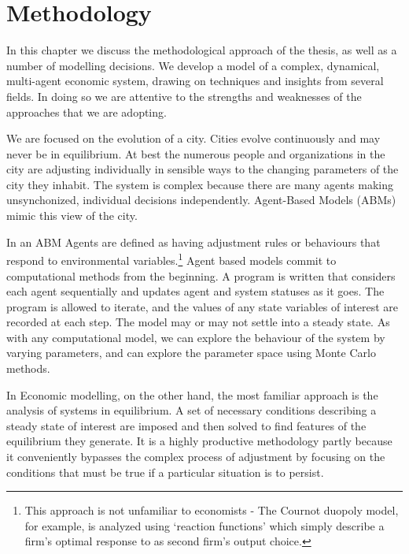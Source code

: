 \chapter{Methodology} \label{chapter-methodology}

In this chapter we discuss the methodological approach of the thesis, as well as a number of modelling decisions. We develop a model of a complex, dynamical, multi-agent economic system, drawing on techniques and insights from several fields. In doing so we are attentive to the strengths and weaknesses of the approaches that we are adopting. 

We are focused on the evolution of a city. Cities evolve continuously and may never be in  equilibrium. At best the numerous people and organizations in the city are adjusting individually in sensible ways to the changing parameters of the city they inhabit. The system is complex because there are many agents making unsynchonized, individual decisions independently. %
Agent-Based Models (ABMs) mimic this view of the city.   

In an ABM Agents are defined as having adjustment rules or behaviours that respond to environmental variables.\footnote{This approach is not unfamiliar to economists - The Cournot duopoly model, for example,  is analyzed using  `reaction functions' which simply describe a firm's optimal response to as second firm's output choice.} Agent based models commit to computational methods from the beginning.  A program is written that considers each agent sequentially and updates agent and system statuses as it goes. The program  is  allowed to iterate, and the values of any state variables of interest are recorded at each step. The model may or may not settle into a  steady state. As with any computational model, we can  explore the behaviour of the system by varying parameters, and  can explore the parameter space using Monte Carlo methods.

In Economic modelling, on the other hand, the most familiar approach is the  analysis of systems in equilibrium. A set of necessary conditions describing a steady state of interest are imposed and then solved to find features of the equilibrium they generate.  It is a highly productive methodology partly because it conveniently  bypasses the complex process of adjustment by focusing on the conditions that must be true if a particular situation is to persist.


